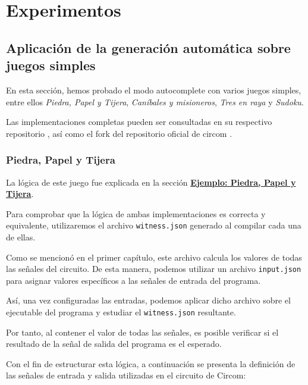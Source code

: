 \documentclass[a4paper,12pt]{report}
\begin{document}
	\chapter{Experimentos}
	
	\section{Aplicación de la generación automática sobre juegos simples}
	\noindent En esta sección, hemos probado el modo autocomplete con varios juegos simples, entre ellos \textit{Piedra, Papel y Tijera}, \textit{Caníbales y misioneros}, \textit{Tres en raya} y \textit{Sudoku}.
	
	\vspace{0.2cm}
	\noindent Las implementaciones completas pueden ser consultadas en su respectivo repositorio \cite{rps_circom}, así como el fork del repositorio oficial de circom \cite{circom_autocomplete}.
	
	\subsection{Piedra, Papel y Tijera}
	\noindent La lógica de este juego fue explicada en la sección \hyperref[s:ex-ppt]{\textbf{Ejemplo: Piedra, Papel y Tijera}}. 
	
	\vspace{0.2cm}
	\noindent Para comprobar que la lógica de ambas implementaciones es correcta y equivalente, utilizaremos el archivo \texttt{witness.json} generado al compilar cada una de ellas.
	
	\vspace{0.2cm}
	\noindent Como se mencionó en el primer capítulo, este archivo calcula los valores de todas las señales del circuito. De esta manera, podemos utilizar un archivo \texttt{input.json} para asignar valores específicos a las señales de entrada del programa. 
	
	\vspace{0.2cm}
	\noindent Así, una vez configuradas las entradas, podemos aplicar dicho archivo sobre el ejecutable del programa y estudiar el \texttt{witness.json} resultante.
	
	\vspace{0.2cm}
	\noindent Por tanto, al contener el valor de todas las señales, es posible verificar si el resultado de la señal de salida del programa es el esperado.
	
	\vspace{0.2cm}
	\noindent Con el fin de estructurar esta lógica, a continuación se presenta la definición de las señales de entrada y salida utilizadas en el circuito de Circom:
	
\end{document}
